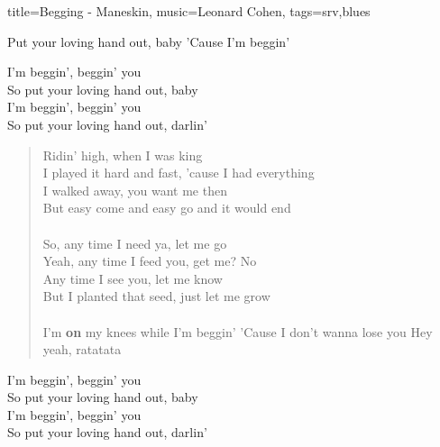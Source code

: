 \begin{song}{title={Begging - Maneskin}, music={Leonard Cohen}, tags={srv,blues}}
\begin{intro}
	Put your loving hand out, baby
	'Cause I'm beggin'
\end{intro}
\begin{chorus}
  I'm beggin', beggin' you
\\
  So put your loving hand out, baby
\\
  I'm beggin', beggin' you
\\
  So put your loving hand out, darlin'
\end{chorus}

\begin{verse}
	Ridin' high, when I was king
\\
	I played it hard and fast, 'cause I had everything
\\
	I walked away, you want me then
\\
	But easy come and easy go and it would end \\ \\
	So, any time I need ya, let me go
\\
	Yeah, any time I feed you, get me? No \\
	Any time I see you, let me know
\\
	But I planted that seed, just let me grow
 \\ \\
	I'm \textbf{on} my knees while I'm beggin'
	'Cause I don't wanna lose you
	Hey yeah, ratatata	
\end{verse}

\begin{chorus}
	I'm beggin', beggin' you
\\
	So put your loving hand out, baby
\\
	I'm beggin', beggin' you
\\
	So put your loving hand out, darlin'
\end{chorus}


\end{song}

